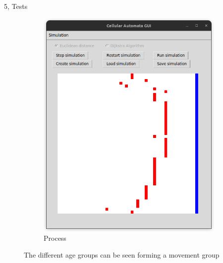 \documentclass[10pt,a4paper]{article}
\begin{document}
\begin{task}{5, Tests}
\begin{figure}[H]
\begin{subfigure}[b]{0.3\textwidth}
         \includegraphics[width=\textwidth]{images/scenario7_middle.png}
         \caption{Process}
         \label{fig:rimea7b}
     \end{subfigure}
    \caption{The different age groups can be seen forming a movement group }
    \label{fig:rimea7}
\end{figure}
\end{task}



\end{document}
